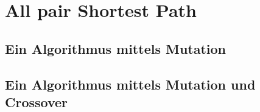 \section{All pair Shortest Path}
\subsection{Ein Algorithmus mittels Mutation}
\subsection{Ein Algorithmus mittels Mutation und Crossover}